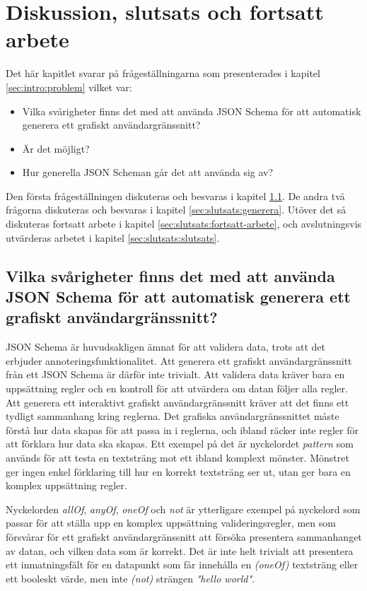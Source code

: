 \chapter{Diskussion, slutsats och fortsatt arbete}
\label{sec:slutsats}

Det här kapitlet svarar på frågeställningarna som presenterades i kapitel \ref{sec:intro:problem} vilket var:

\begin{itemize}
	\item Vilka svårigheter finns det med att använda JSON Schema för att automatisk generera ett grafiskt
	användargränssnitt?
	\item Är det möjligt?
	\item Hur generella JSON Scheman går det att använda sig av?
\end{itemize}

Den första frågeställningen diskuteras och besvaras i kapitel \ref{sec:slutsats:json-schema}. De andra två frågorna diskuteras och besvaras i kapitel \ref{sec:slutsats:generera}. Utöver det så diskuteras fortsatt arbete i kapitel \ref{sec:slutsats:fortsatt-arbete}, och avslutningsvis utvärderas arbetet i kapitel \ref{sec:slutsats:slutsats}.
  
\section{Vilka svårigheter finns det med att använda JSON Schema för att automatisk generera ett grafiskt användargränssnitt?}
\label{sec:slutsats:json-schema}
JSON Schema är huvudsakligen ämnat för att validera data, trots att det erbjuder annoteringsfunktionalitet. Att generera ett grafiskt användargränssnitt från ett JSON Schema är därför inte trivialt. Att validera data kräver bara en uppsättning regler och en kontroll för att utvärdera om datan följer alla regler. Att generera ett interaktivt grafiskt användargränssnitt kräver att det finns ett tydligt sammanhang kring reglerna. Det grafiska användargränssnittet måste förstå hur data skapas för att passa in i reglerna, och ibland räcker inte regler för att förklara hur data ska skapas. Ett exempel på det är nyckelordet \textit{pattern} som används för att testa en textsträng mot ett ibland komplext mönster. Mönstret ger ingen enkel förklaring till hur en korrekt textsträng ser ut, utan ger bara en komplex uppsättning regler.

Nyckelorden \textit{allOf}, \textit{anyOf}, \textit{oneOf} och \textit{not} är ytterligare exempel på nyckelord som passar för att ställa upp en komplex uppsättning valideringsregler, men som försvårar för ett grafiskt användargränssnitt att försöka presentera sammanhanget av datan, och vilken data som är korrekt. Det är inte helt trivialt att presentera ett inmatningsfält för en datapunkt som får innehålla en \textit{(oneOf)} textsträng eller ett booleskt värde, men inte \textit{(not)} strängen \textit{"hello world"}.

